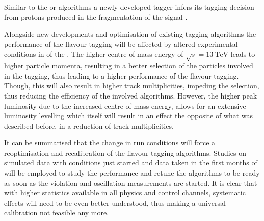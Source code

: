 Similar to the \SSpi or \SSK algorithms a newly developed \SSp tagger infers
its tagging decision from protons produced in the fragmentation of the signal
\Bmeson. 

Alongside new developments and optimisation of existing tagging algorithms the
performance of the flavour tagging will be affected by altered experimental
conditions in \RunTwo of the \LHC. The higher centre-of-mass energy of
$\sqrt{s}=\SI{13}{\TeV}$ leads to higher particle momenta, resulting in a better
selection of the particles involved in the tagging, thus leading to a higher
performance of the flavour tagging. Though, this will also result in higher
track multiplicities, impeding the selection, thus reducing the efficiency of
the involved algorithms. However, the higher peak luminosity due to the
increased centre-of-mass energy, allows for an extensive luminosity levelling
which itself will result in an effect the opposite of what was described before,
in a reduction of track multiplicities.

It can be summarised that the change in run conditions will force a
reoptimisation and recalibration of the flavour tagging algorithms. Studies on
\MC simulated data with \RunTwo conditions just started and data taken in the
first months of \RunTwo will be employed to study the performance and retune the
algorithms to be ready as soon as the \CP violation and \B oscillation
measurements are started. It is clear that with higher statistics available in
all physics and control channels, systematic effects will need to be even better
understood, thus making a universal calibration not feasible any more.




